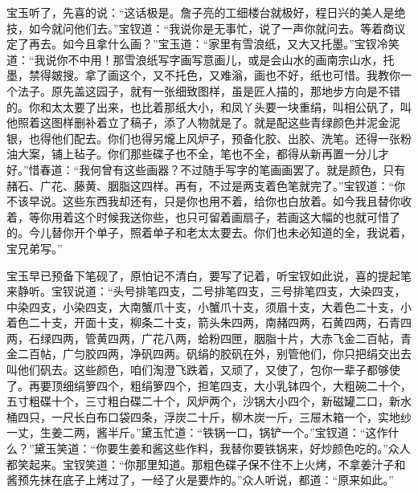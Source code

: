 宝玉听了，先喜的说：``这话极是。詹子亮的工细楼台就极好，程日兴的美人是绝技，如今就问他们去。''宝钗道：``我说你是无事忙，说了一声你就问去。等着商议定了再去。如今且拿什么画？''宝玉道：``家里有雪浪纸，又大又托墨。''宝钗冷笑道：``我说你不中用！那雪浪纸写字画写意画儿，或是会山水的画南宗山水，托墨，禁得皴搜。拿了画这个，又不托色，又难滃，画也不好，纸也可惜。我教你一个法子。原先盖这园子，就有一张细致图样，虽是匠人描的，那地步方向是不错的。你和太太要了出来，也比着那纸大小，和凤丫头要一块重绢，叫相公矾了，叫他照着这图样删补着立了稿子，添了人物就是了。就是配这些青绿颜色并泥金泥银，也得他们配去。你们也得另爖上风炉子，预备化胶、出胶、洗笔。还得一张粉油大案，铺上毡子。你们那些碟子也不全，笔也不全，都得从新再置一分儿才好。''惜春道：``我何曾有这些画器？不过随手写字的笔画画罢了。就是颜色，只有赭石、广花、藤黄、胭脂这四样。再有，不过是两支着色笔就完了。''宝钗道：``你不该早说。这些东西我却还有，只是你也用不着，给你也白放着。如今我且替你收着，等你用着这个时候我送你些，也只可留着画扇子，若画这大幅的也就可惜了的。今儿替你开个单子，照着单子和老太太要去。你们也未必知道的全，我说着，宝兄弟写。''

宝玉早已预备下笔砚了，原怕记不清白，要写了记着，听宝钗如此说，喜的提起笔来静听。宝钗说道：``头号排笔四支，二号排笔四支，三号排笔四支，大染四支，中染四支，小染四支，大南蟹爪十支，小蟹爪十支，须眉十支，大着色二十支，小着色二十支，开面十支，柳条二十支，箭头朱四两，南赭四两，石黄四两，石青四两，石绿四两，管黄四两，广花八两，蛤粉四匣，胭脂十片，大赤飞金二百帖，青金二百帖，广匀胶四两，净矾四两。矾绢的胶矾在外，别管他们，你只把绢交出去叫他们矾去。这些颜色，咱们淘澄飞跌着，又顽了，又使了，包你一辈子都够使了。再要顶细绢箩四个，粗绢箩四个，担笔四支，大小乳钵四个，大粗碗二十个，五寸粗碟十个，三寸粗白碟二十个，风炉两个，沙锅大小四个，新磁罐二口，新水桶四只，一尺长白布口袋四条，浮炭二十斤，柳木炭一斤，三屉木箱一个，实地纱一丈，生姜二两，酱半斤。''黛玉忙道：``铁锅一口，锅铲一个。''宝钗道：``这作什么？''黛玉笑道：``你要生姜和酱这些作料，我替你要铁锅来，好炒颜色吃的。''众人都笑起来。宝钗笑道：``你那里知道。那粗色碟子保不住不上火烤，不拿姜汁子和酱预先抹在底子上烤过了，一经了火是要炸的。''众人听说，都道：``原来如此。''

